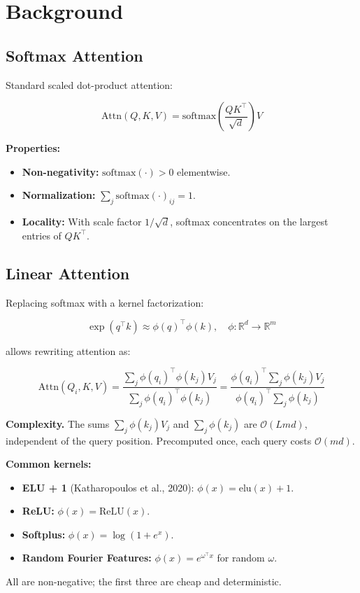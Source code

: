 
\section{Background}

\subsection{Softmax Attention}

Standard scaled dot-product attention:

\[
\text{Attn}(Q, K, V) = \text{softmax}\!\left(\frac{QK^\top}{\sqrt{d}}\right)V
\]

\textbf{Properties:}
\begin{itemize}
\item \textbf{Non-negativity:} $\text{softmax}(\cdot) > 0$ elementwise.
\item \textbf{Normalization:} $\sum_j \text{softmax}(\cdot)_{ij} = 1$.
\item \textbf{Locality:} With scale factor $1/\sqrt{d}$, softmax concentrates on
  the largest entries of $QK^\top$.

\end{itemize}
\subsection{Linear Attention}

Replacing softmax with a kernel factorization:

\[
\exp(q^\top k) \approx \phi(q)^\top \phi(k), \quad \phi: \mathbb{R}^d \to \mathbb{R}^m
\]

allows rewriting attention as:

\[
\text{Attn}(Q_i, K, V) = \frac{\sum_j \phi(q_i)^\top \phi(k_j) V_j}{\sum_j \phi(q_i)^\top \phi(k_j)} = \frac{\phi(q_i)^\top \sum_j \phi(k_j) V_j}{\phi(q_i)^\top \sum_j \phi(k_j)}
\]

\textbf{Complexity.} The sums $\sum_j \phi(k_j) V_j$ and $\sum_j \phi(k_j)$ are 
$\mathcal{O}(L m d)$, independent of the query position. Precomputed once, 
each query costs $\mathcal{O}(m d)$.

\textbf{Common kernels:}
\begin{itemize}
\item \textbf{ELU + 1} (Katharopoulos et al., 2020): $\phi(x) = \text{elu}(x) + 1$.
\item \textbf{ReLU:} $\phi(x) = \text{ReLU}(x)$.
\item \textbf{Softplus:} $\phi(x) = \log(1 + e^x)$.
\item \textbf{Random Fourier Features:} $\phi(x) = e^{\omega^\top x}$ for random
  $\omega$.

\end{itemize}
All are non-negative; the first three are cheap and deterministic.


